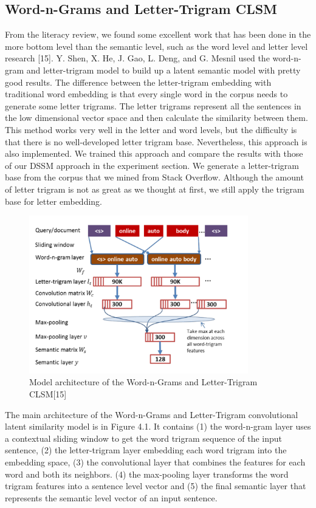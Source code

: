 	\subsection{Word-n-Grams and Letter-Trigram CLSM}
	
	From the literacy review, we found some excellent work that has been done in the more bottom level than the semantic level, such as the word level and letter level research [15]. Y. Shen, X. He, J. Gao, L. Deng, and G. Mesnil used the word-n-gram and letter-trigram model to build up a latent semantic model with pretty good results. The difference between the letter-trigram embedding with traditional word embedding is that every single word in the corpus needs to generate some letter trigrams. The letter trigrams represent all the sentences in the low dimensional vector space and then calculate the similarity between them. This method works very well in the letter and word levels, but the difficulty is that there is no well-developed letter trigram base. Nevertheless, this approach is also implemented. We trained this approach and compare the results with those of our DSSM approach in the experiment section. We generate a letter-trigram base from the corpus that we mined from Stack Overflow. Although the amount of letter trigram is not as great as we thought at first, we still apply the trigram base for letter embedding. 
\par
\begin{figure}[!h]
		\centering
		\includegraphics[width = 0.85\textwidth]{figures/wnglt.png}
		\caption{Model architecture of the Word-n-Grams and Letter-Trigram CLSM[15]}
	\end{figure}
The main architecture of the Word-n-Grams and Letter-Trigram convolutional latent similarity model is in Figure 4.1. It contains (1) the word-n-gram layer uses a contextual sliding window to get the word trigram sequence of the input sentence, (2) the letter-trigram layer embedding each word trigram into the embedding space, (3) the convolutional layer that combines the features for each word and both its neighbors. (4) the max-pooling layer transforms the word trigram features into a sentence level vector and (5) the final semantic layer that represents the semantic level vector of an input sentence.  \par
